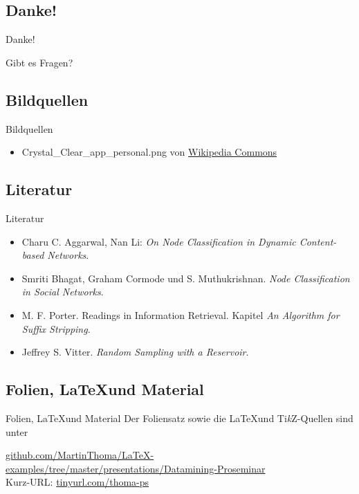 \subsection{Danke!}
\begin{frame}{Danke!}
    \begin{center}
        \Huge
	    Gibt es Fragen?
    \end{center}
\end{frame}

\subsection{Bildquellen}
\begin{frame}{Bildquellen}
\begin{itemize}
	\item Crystal\_Clear\_app\_personal.png von \href{https://commons.wikimedia.org/wiki/File:Crystal_Clear_app_personal.png}{Wikipedia Commons}
\end{itemize}
\end{frame}

\subsection{Literatur}
\begin{frame}{Literatur}
\begin{itemize}
    \item Charu C. Aggarwal, Nan Li: \textit{On Node Classification in Dynamic Content-based Networks}.
    \item Smriti Bhagat, Graham Cormode und S. Muthukrishnan. \textit{Node Classification in Social Networks}.
    \item M. F. Porter. Readings in Information Retrieval. Kapitel \textit{An Algorithm for Suffix Stripping}.
    \item Jeffrey S. Vitter. \textit{Random Sampling with a Reservoir}.
\end{itemize}
\end{frame}

\subsection{Folien, \LaTeX und Material}
\begin{frame}{Folien, \LaTeX und Material}
Der Foliensatz sowie die \LaTeX und Ti\textit{k}Z-Quellen sind unter

\href{https://github.com/MartinThoma/LaTeX-examples/tree/master/presentations/Datamining-Proseminar}{github.com/MartinThoma/LaTeX-examples/tree/master/presentations/Datamining-Proseminar}
\\

Kurz-URL:
\href{http://tinyurl.com/thoma-ps}{tinyurl.com/thoma-ps}
\end{frame}
